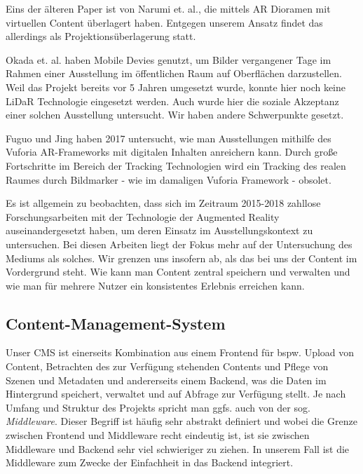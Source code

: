 \documentclass[titlepage, a4paper, 11pt]{scrartcl}
\begin{document}
      Eins der älteren Paper ist von Narumi et. al.\cite{narumi2011digital}, die mittels AR Dioramen mit virtuellen Content überlagert haben.
      Entgegen unserem Ansatz findet das allerdings als Projektionsüberlagerung statt.

      Okada et. al. haben Mobile Devies genutzt, um Bilder vergangener Tage im Rahmen einer Ausstellung im öffentlichen Raum auf Oberflächen darzustellen\cite{okada2015manseibashi}.
      Weil das Projekt bereits vor 5 Jahren umgesetzt wurde, konnte hier noch keine LiDaR Technologie eingesetzt werden. 
      Auch wurde hier die soziale Akzeptanz einer solchen Ausstellung untersucht. Wir haben andere Schwerpunkte gesetzt.

      Fuguo und Jing haben 2017 untersucht, wie man Ausstellungen mithilfe des Vuforia AR-Frameworks mit digitalen Inhalten anreichern kann\cite{peng2017mobile}. Durch große Fortschritte
      im Bereich der Tracking Technologien wird ein Tracking des realen Raumes durch Bildmarker - wie im damaligen Vuforia Framework - obsolet.

      Es ist allgemein zu beobachten, dass sich im Zeitraum 2015-2018 zahllose Forschungsarbeiten mit der Technologie der Augmented Reality auseinandergesetzt haben,
      um deren Einsatz im Ausstellungskontext zu untersuchen. Bei diesen Arbeiten liegt der Fokus mehr auf der Untersuchung des Mediums als solches. Wir grenzen uns insofern ab,
      als das bei uns der Content im Vordergrund steht. Wie kann man Content zentral speichern und verwalten und wie man für mehrere Nutzer ein konsistentes Erlebnis 
      erreichen kann.

      \pagebreak

    \subsection{Content-Management-System}

      Unser CMS ist einerseits Kombination aus einem Frontend für bspw. Upload von Content, Betrachten des zur Verfügung stehenden Contents und Pflege von Szenen und Metadaten 
      und andererseits einem Backend, was die Daten im Hintergrund speichert, verwaltet und auf Abfrage zur Verfügung stellt. Je nach Umfang und Struktur des Projekts spricht man ggfs. auch 
      von der sog. \textit{Middleware}. Dieser Begriff ist häufig sehr abstrakt definiert und wobei die Grenze zwischen Frontend und Middleware recht eindeutig ist,
      ist sie zwischen Middleware und Backend sehr viel schwieriger zu ziehen. In unserem Fall ist die Middleware zum Zwecke der Einfachheit in das Backend integriert.
\end{document}

